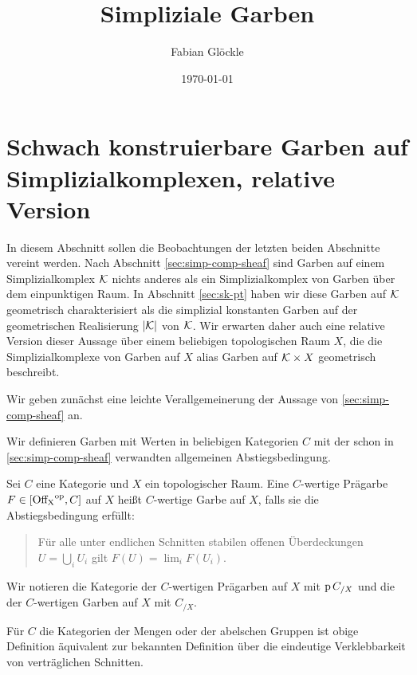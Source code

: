 



\title{Simpliziale Garben}
\author{Fabian Glöckle}
\date{\today}

\section{Schwach konstruierbare Garben auf Simplizialkomplexen, relative Version}

In diesem Abschnitt sollen die Beobachtungen der letzten beiden
Abschnitte vereint werden. Nach
Abschnitt \autoref{sec:simp-comp-sheaf} sind Garben auf einem
Simplizialkomplex $\mathcal{K}$ nichts anderes als ein Simplizialkomplex von
Garben über dem einpunktigen Raum. In Abschnitt
\autoref{sec:sk-pt} haben wir diese Garben auf $\mathcal{K}$ geometrisch
charakterisiert als die simplizial konstanten Garben auf der
geometrischen Realisierung $|\mathcal{K}|$ von $\mathcal{K}$. Wir erwarten daher auch
eine relative Version dieser Aussage über einem beliebigen
topologischen Raum $X$, die die Simplizialkomplexe von Garben auf $X$
alias Garben auf $\mathcal{K} \times X$ geometrisch beschreibt.

Wir geben zunächst eine leichte Verallgemeinerung der Aussage von
\autoref{sec:simp-comp-sheaf} an.

Wir definieren Garben mit Werten in beliebigen Kategorien $C$ mit der
schon in \autoref{sec:simp-comp-sheaf} verwandten allgemeinen
Abstiegsbedingung.
\begin{defn}[\cite{TG}, 2.1.5]
  Sei $C$ eine Kategorie und $X$ ein topologischer Raum. Eine
  $C$-wertige Prägarbe $F \in [\operatorname{Off_X}^\mathrm{op}, C]$ auf $X$ heißt $C$-wertige
  Garbe auf $X$, falls sie die Abstiegsbedingung erfüllt:
  \begin{quote}
    Für alle unter endlichen Schnitten stabilen offenen Überdeckungen
    $U = \bigcup_i U_i$ gilt $F(U) = \lim_i F(U_i)$.
  \end{quote}
\end{defn}
Wir notieren die Kategorie der $C$-wertigen Prägarben auf $X$ mit $\operatorname{p}
C_{/X}$ und die der $C$-wertigen Garben auf $X$ mit $C_{/X}$.

Für $C$ die Kategorien der Mengen oder der abelschen Gruppen ist obige
Definition äquivalent zur bekannten Definition über die eindeutige
Verklebbarkeit von verträglichen Schnitten.

